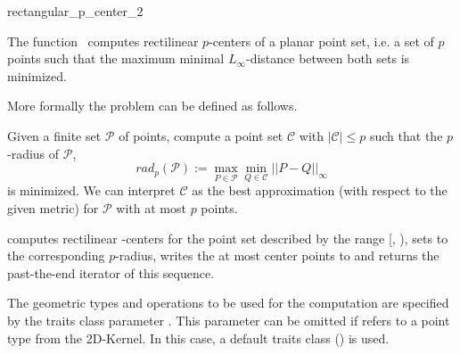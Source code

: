 
\cgalColumnLayout

\begin{ccRefFunction}{rectangular_p_center_2}
  
  \ccDefinition The function \ccRefName\ computes rectilinear
  $p$-centers of a planar point set, i.e. a set of $p$ points such
  that the maximum minimal $L_{\infty}$-distance between both sets is
  minimized.
  
  More formally the problem can be defined as follows.
  
  Given a finite set $\mathcal{P}$ of points, compute a
    point set $\mathcal{C}$ with $|\mathcal{C}| \le p$ such that the
    $p$-radius of $\mathcal{P}$,
    $$
    rad_p(\mathcal{P}) := \max_{P \in \mathcal{P}} \min_{Q \in
      \mathcal{C}} || P - Q ||_\infty
    $$
    is minimized. We can interpret $\mathcal{C}$ as the best
    approximation (with respect to the given metric) for $\mathcal{P}$
    with at most $p$ points.


  \def\ccLongParamLayout{\ccTrue} 
  
  
  computes rectilinear -centers for the point set described by
  the range [, ), sets  to the corresponding
  $p$-radius, writes the at most  center points to  and
  returns the past-the-end iterator of this sequence.
  
  
  The geometric types and operations to be used for the computation
  are specified by the traits class parameter . This parameter
  can be omitted if  refers to a point type from
  the 2D-Kernel. In this case, a default traits class
  () is used.
  

\end{ccRefFunction}
